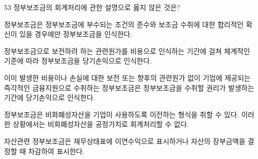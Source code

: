 \begin{question}{53}
정부보조금의 회계처리에 관한 설명으로 옳지 않은 것은?
\begin{choices}
  \item 정부보조금은 정부보조금에 부수되는 조건의 준수와 보조금 수취에 대한 합리적인 확신이 있을 경우에만 정부보조금을 인식한다.
  \item 정부보조금으로 보전하려 하는 관련원가를 비용으로 인식하는 기간에 걸쳐 체계적인 기준에 따라 정부보조금을 당기손익으로 인식한다.
  \item 이미 발생한 비용이나 손실에 대한 보전 또는 향후의 관련원가 없이 기업에 제공되는 즉각적인 금융지원으로 수취하는 정부보조금은 정부보조금을 수취할 권리가 발생하는 기간에 당기손익으로 인식한다.
  \item 정부보조금은 비화폐성자산을 기업이 사용하도록 이전하는 형식을 취할 수 있다. 이러한 상황에서는 비화폐성자산을 공정가치로 회계처리할 수 없다.
  \item 자산관련 정부보조금은 재무상태표에 이연수익으로 표시하거나 자산의 장부금액을 결정할 때 차감하여 표시한다.
\end{choices}
\end{question}
